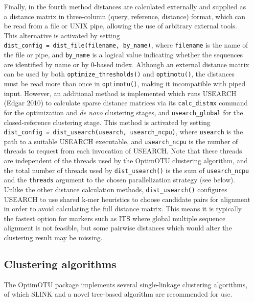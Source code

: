 \documentclass[
]{article}
\begin{document}
Finally, in the fourth method distances are calculated externally and supplied as a distance matrix in three-column (query, reference, distance) format, which can be read from a file or UNIX pipe, allowing the use of arbitrary external tools.
This alternative is activated by setting \texttt{dist\_config\ =\ dist\_file(filename,\ by\_name)}, where \texttt{filename} is the name of the file or pipe, and \texttt{by\_name} is a logical value indicating whether the sequences are identified by name or by 0-based index.
Although an external distance matrix can be used by both \texttt{optimize\_thresholds()} and \texttt{optimotu()}, the distances must be read more than once in \texttt{optimotu()}, making it incompatible with piped input.
However, an additional method is implemented which runs USEARCH (Edgar 2010) to calculate sparse distance matrices via its \texttt{calc\_distmx} command for the optimization and \emph{de novo} clustering stages, and \texttt{usearch\_global} for the closed-reference clustering stage.
This method is activated by setting \texttt{dist\_config\ =\ dist\_usearch(usearch,\ usearch\_ncpu)}, where \texttt{usearch} is the path to a suitable USEARCH executable, and \texttt{usearch\_ncpu} is the number of threads to request from each invocation of USEARCH.
Note that these threads are independent of the threads used by the OptimOTU clustering algorithm, and the total number of threads used by \texttt{dist\_usearch()} is the sum of \texttt{usearch\_ncpu} and the \texttt{threads} argument to the chosen parallelization strategy (see below).
Unlike the other distance calculation methods, \texttt{dist\_usearch()} configures USEARCH to use shared k-mer heuristics to choose candidate pairs for alignment in order to avoid calculating the full distance matrix.
This means it is typically the fastest option for markers such as ITS where global multiple sequence alignment is not feasible, but some pairwise distances which would alter the clustering result may be missing.

\subsection{Clustering algorithms}\label{clustering-algorithms}

The OptimOTU package implements several single-linkage clustering algorithms, of which SLINK and a novel tree-based algorithm are recommended for use.
\end{document}
